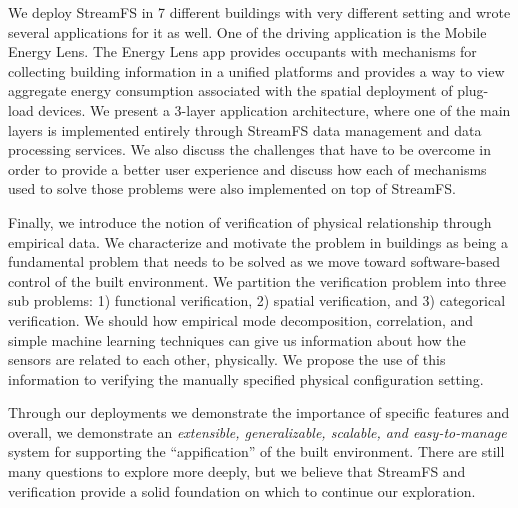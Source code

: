 We deploy StreamFS in 7 different buildings with very different setting and wrote several applications for it as well.  One of the driving
application is the Mobile Energy Lens.  The Energy Lens app provides occupants with mechanisms for collecting building information
in a unified platforms and provides a way to view aggregate energy consumption associated with the spatial deployment
of plug-load devices.  We present a 3-layer application architecture, where one of the main layers is implemented entirely through
StreamFS data management and data processing services.  We also discuss the challenges that have to be overcome in order to
provide a better user experience and discuss how each of mechanisms used to solve those problems were also implemented on top of StreamFS.

Finally, we introduce the notion of verification of physical relationship through empirical data.  We characterize and motivate the problem
in buildings as being a fundamental problem that needs to be solved as we move toward software-based control of the built environment.
We partition the verification problem into three sub problems: 1) functional verification, 2) spatial verification, and 3) categorical
verification.  We should how empirical mode decomposition, correlation, and simple machine learning techniques can give us 
information about how the sensors are related to each other, physically.  We propose the use of this information to 
verifying the manually specified physical configuration setting.

Through our deployments we demonstrate the importance of specific features and overall, we demonstrate an \emph{extensible, generalizable,
scalable, and easy-to-manage} system for supporting the ``appification'' of the built environment.  There are still many
questions to explore more deeply, but we believe that StreamFS and verification provide a solid foundation on which to continue
our exploration.



